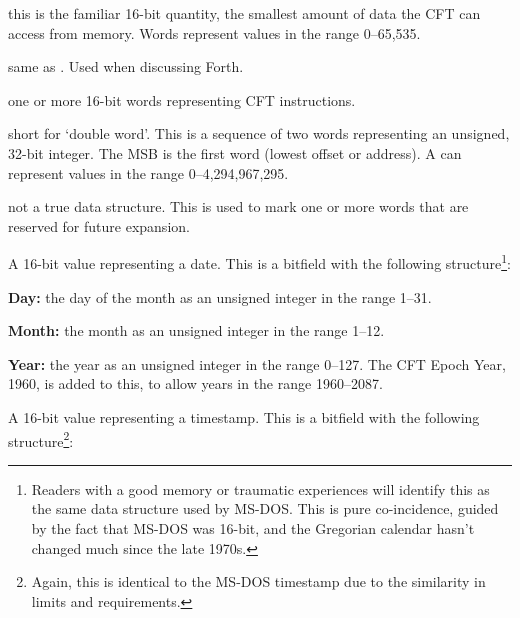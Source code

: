 \begin{description}
  \item{} this is the familiar 16-bit quantity, the
    smallest amount of data the CFT can access from memory. Words represent
    values in the range 0–65,535.
  \item{} same as . Used when discussing
    Forth.
  \item{} one or more 16-bit words representing CFT
    instructions.
  \item{} short for ‘double word’. This is a sequence
    of two words representing an unsigned, 32-bit integer. The \gls{MSB} is the
    first word (lowest offset or address). A  can represent values in
    the range 0–4,294,967,295.
  \item{} not a true data structure. This is used
    to mark one or more words that are reserved for future expansion.
  \item{} A 16-bit value representing a date. This is a
    bitfield with the following structure\footnote{Readers with a good memory
      or traumatic experiences will identify this as the same data structure
      used by MS-DOS. This is pure co-incidence, guided by the fact that MS-DOS
      was 16-bit, and the Gregorian calendar hasn't changed much since the late
      1970s.}:

    \begin{cbitfield}
    \end{cbitfield}

    \begin{description}
      \item {\bfseries Day:} the day of the month as an unsigned integer in the range 1–31.
      \item {\bfseries Month:} the month as an unsigned integer in the range 1–12.
      \item {\bfseries Year:} the year as an unsigned integer in the range
        0–127. The CFT Epoch Year, 1960, is added to this, to allow years in
        the range 1960–2087.
    \end{description}

  \item{} A 16-bit value representing a timestamp. This
    is a bitfield with the following structure\footnote{Again, this is
      identical to the MS-DOS timestamp due to the similarity in limits and
      requirements.}:


\end{description}
